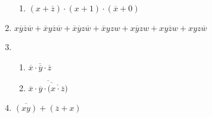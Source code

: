 \documentclass{article}
\begin{document}
\begin{enumerate}
\begin{enumerate}
		      \item \( (x + \overline{z} ) \cdot (x + 1) \cdot (\overline{x} + 0) \)

	      \end{enumerate}

	\item \( x \overline{y} \overline{z} \overline{w} + \overline{x} y
	      \overline{z} \overline{w} + \overline{x} \overline{y} z \overline{w}
	      + \overline{x} yzw + x \overline{y} zw + xy \overline{z} w + xyz
	      \overline{w}\)

	\item
	      \begin{enumerate}

		      \item \( \overline{\overline{x} \cdot \overline{y} \cdot
			            \overline{z}} \)

		      \item \( \overline{ \overline{x} \cdot \overline{\overline{y} \cdot (
			            \overline{ x \cdot \overline{z}}})} \)

	      \end{enumerate}

	\item \( \overline{(xy)} + (\overline{z} +x) \)


\end{enumerate}
\end{document}
